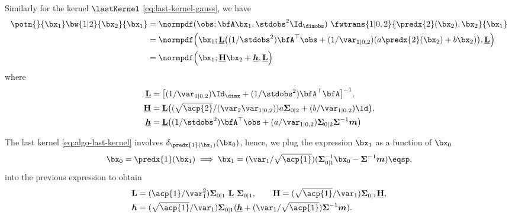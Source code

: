 Similarly for the kernel $\lastKernel$ \eqref{eq:last-kernel-gauss}, we have
\begin{equation*}
    \begin{aligned}
        \potn{}{\bx_1} \bw{1|2}{\bx_2}{\bx_1}
            & = \normpdf(\obs; \bfA \bx_1, \stdobs^2 \Id_\dimobs) \ \fwtrans{1 | 0, 2}{\predx{2}(\bx_2), \bx_2}{\bx_1} \\
            & = \normpdf \Big(\bx_1;
                \Lcovbefore \big((1/\stdobs^2) \bfA^\top \obs + (1/\var_{1|0, 2}) (a \predx{2}(\bx_2) + b \bx_2) \big),
                \Lcovbefore
            \Big)\\
            & = \normpdf \Big(\bx_1;
                \LHbefore \bx_2 + \Lbiasbefore,
                \Lcovbefore
             \Big)
    \end{aligned}
\end{equation*}
where
\begin{align*}
    \Lcovbefore 
        & = \big[ (1/\var_{1|0, 2}) \Id_\dimx + (1/\stdobs^2) \bfA^\top\bfA \big]^{-1},
        \\
    \LHbefore
        & =  \Lcovbefore \big(
            (\sqrt{\acp{2}}/(\var_{2}\var_{1|0,2})) a \cov_{0|2} + (b/\var_{1|0,2}) \Id
            \big),
        \\
    \Lbiasbefore
        & = \Lcovbefore \big( (1/\stdobs^2) \bfA^\top \obs + (a/\var_{1|0,2}) \cov_{0|2}\cov^{-1} \mean \big)
\end{align*}

The last kernel \eqref{eq:algo-last-kernel} involves $\delta_{\predx{1}(\bx_1)}(\bx_0)$, hence, we plug the expression $\bx_1$ as a function of $\bx_0$
\begin{align*}
    \bx_0 = \predx{1}(\bx_1) \implies \bx_1 = (\var_1 / \sqrt{\acp{1}}) (\cov_{0|1}^{-1} \bx_0 - \cov^{-1} \mean)
    \eqsp,
\end{align*}
into the previous expression to obtain
\begin{align*}
    \Lcov
        & = (\acp{1}/ \var_1^2) \cov_{0|1} \ \Lcovbefore \ \cov_{0|1},
    \qquad
    \LH
        = (\sqrt{\acp{1}}/ \var_1) \cov_{0|1} \LHbefore,\\
    \Lbias
        & = (\sqrt{\acp{1}}/ \var_1) \cov_{0|1} (\Lbiasbefore + (\var_1/\sqrt{\acp{1}}) \cov^{-1}\mean).
\end{align*}




\renewcommand{\hpotn}[2]{\ifthenelse{\equal{#2}{}}{\hat{g}^\param _{#1}}{\hat{g}^\param _{#1}(#2)}}
